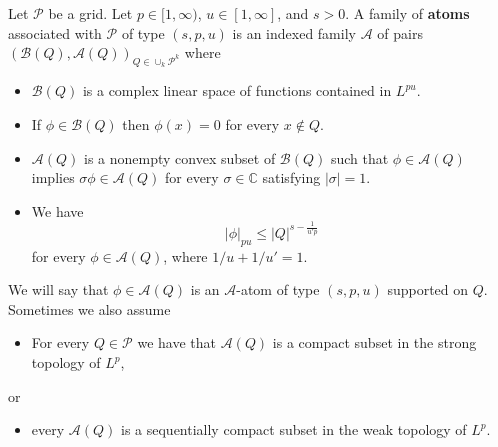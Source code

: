 \documentclass[11pt]{amsart}
\theoremstyle{definition}
\begin{document}
Let $\mathcal{P}$ be a grid. Let $p \in [1,\infty)$, $u \in [1,\infty]$, and
$s>0$. A family of {\bf atoms} associated with $\mathcal{P}$ of type $(s,p,u)$
is an indexed family $\mathcal{A}$ of pairs
$(\mathcal{B}(Q),\mathcal{A}(Q))_{Q\in \cup_k \mathcal{P}^k}$ where
\begin{itemize}
\item[$A_1$.] $\mathcal{B}(Q)$ is a complex linear space of functions
contained in $L^{pu}$.
\item[$A_2$.] If $\phi \in \mathcal{B}(Q)$ then $\phi(x)=0$ for every
$x \not\in Q$.
\item[$A_3$.] $\mathcal{A}(Q)$ is a nonempty convex subset of $\mathcal{B}(Q)$
such that $\phi \in \mathcal{A}(Q)$ implies
$\sigma\phi\in\mathcal{A}(Q)$ for every $\sigma \in \mathbb{C}$ satisfying
$|\sigma|=1$.
\item[$A_4$.] We have $$|\phi|_{pu} \leq |Q|^{s-\frac{1}{u'p}}$$ for every
$\phi \in \mathcal{A}(Q)$, where $1/u + 1/u' = 1$.
\end{itemize}
We will say that $\phi \in \mathcal{A}(Q)$ is an $\mathcal{A}$-atom of type
$(s,p,u)$ supported on $Q$. Sometimes we also assume
\begin{itemize}
\item[$A_5$.] For every $Q\in \mathcal{P}$ we have that $\mathcal{A}(Q)$ is a
compact subset in the strong topology of $L^p$,
\end{itemize}
or
\begin{itemize}
\item[$A_6$.] every $\mathcal{A}(Q)$ is a sequentially compact subset in the
weak topology of $L^p$.
\end{itemize}
\end{document}
